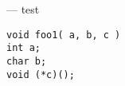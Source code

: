 \startmanpage
{}
--- test  
\startvb\begin{verbatim}
void foo1( a, b, c )
int a;
char b;
void (*c)();

\end{verbatim}
\endvb

\endmanpage
